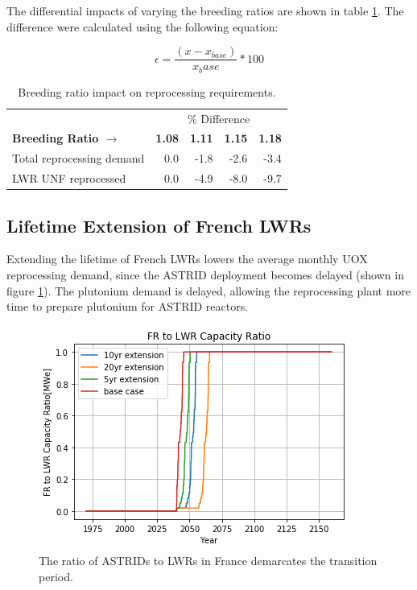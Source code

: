 The differential impacts of varying the breeding ratios are
shown in table \ref{tab:br_diff}. The difference were calculated
using the following equation:

\[ \epsilon = \frac{(x - x_{base})}{x_base} * 100 \]

\begin{table}[h]
	\centering
        \caption{Breeding ratio impact on reprocessing requirements.}
	\begin{tabular}{lrrrr}
		\hline
                & \multicolumn{4}{c}{\% Difference} \\
		\textbf{Breeding Ratio $\longrightarrow$}& \textbf{1.08}& \textbf{1.11} & \textbf{1.15} & \textbf{1.18} \\
		\hline
		Total reprocessing demand & 0.0 & -1.8 & -2.6 & -3.4 \\ 
		\gls{LWR} \gls{UNF} reprocessed & 0.0  & -4.9 & -8.0 & -9.7 \\
		\hline
	\end{tabular}
	\label{tab:br_diff}
\end{table}


\subsection{Lifetime Extension of French \glspl{LWR}}\label{sec:life}
Extending the lifetime of French \glspl{LWR} lowers the average
monthly \gls{UOX} reprocessing demand, since the \gls{ASTRID} deployment becomes 
delayed (shown in figure \ref{fig:pow_diff}). The plutonium demand is delayed,
 allowing the reprocessing plant more time to prepare plutonium for \gls{ASTRID} reactors.

\begin{figure}[htbp!]
    \begin{center}
        \includegraphics[scale=0.7]{./images/sensitivity/pow_ratio.png}
    \end{center}
    \caption{The ratio of \glspl{ASTRID} to \glspl{LWR} in France demarcates 
    the transition period.}
    \label{fig:pow_diff}
\end{figure}

